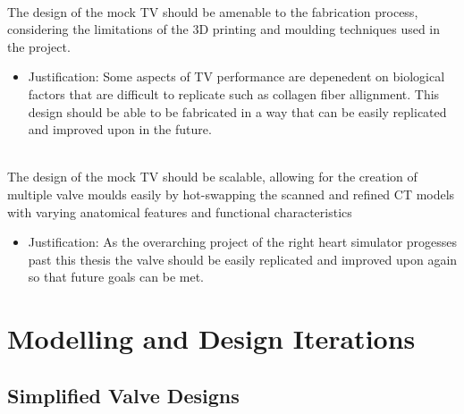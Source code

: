 \begin{fullwidth}
    \\ The design of the mock \gls{TV} should be amenable to the fabrication process, considering the limitations of the 3D printing and moulding techniques used in the project.
    \begin{itemize}
        \item Justification: Some aspects of \gls{TV} performance are depenedent on biological factors that are difficult to replicate such as collagen fiber allignment. This design should be able to be fabricated in a way that can be easily replicated and improved upon in the future.
    \end{itemize}
    \label{sec:Scalability}\\ The design of the mock \gls{TV} should be scalable, allowing for the creation of multiple valve moulds easily by hot-swapping the scanned and refined \gls{CT} models with varying anatomical features and functional characteristics
    \begin{itemize}
        \item Justification: As the overarching project of the right heart simulator progesses past this thesis the valve should be easily replicated and improved upon again so that future goals can be met.
    \end{itemize}
\end{fullwidth}

\section{Modelling and Design Iterations}

\subsection{Simplified Valve Designs}


